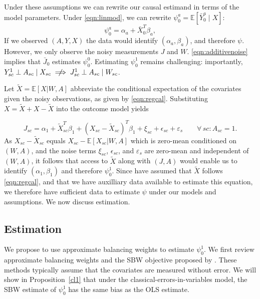 \documentclass[aoas]{imsart}
\theoremstyle{plain}
\theoremstyle{remark}
\begin{document}
Under these assumptions we can rewrite our causal estimand in terms of the model parameters. Under \eqref{eqn:linmod}, we can rewrite $\psi_0^a = \mathbb{E}[\bar{Y}_0^a \mid X]$:
\begin{equation}\label{eqn:outcome}
\psi_0^a = \alpha_a + \bar{X}_0^T\beta_a,   
\end{equation}
If we observed $(A, Y, X)$ the data would identify $(\alpha_a, \beta_a)$, and therefore $\psi$. However, we only observe the noisy measurements $J$ and $W$. \eqref{eqn:additivenoise} implies that $\bar{J}_0$ estimates $\psi_0^0$. Estimating $\psi_0^1$ remains challenging: importantly, $Y_{sc}^1 \perp A_{sc} \mid X_{sc} \centernot\implies J_{sc}^1 \perp A_{sc} \mid W_{sc}$. 

Let $\tilde{X} = \mathbb{E}[X |W, A]$ abbreviate the conditional expectation of the covariates given the noisy observations, as given by \eqref{eqn:regcal}. Substituting $X = \tilde{X} + X - \tilde{X}$ into the outcome model yields

\begin{equation} \label{eqn:JXtilde}
    J_{sc} = \alpha_1 + \tilde{X}_{sc}^T\beta_1 + (X_{sc} - \tilde{X}_{sc})^T\beta_1 + \xi_{sc} + \epsilon_{sc} + \varepsilon_s \qquad\forall\, sc: A_{sc} = 1.
\end{equation}
As $X_{sc} - \tilde{X}_{sc}$ equals $X_{sc} - \mathbb{E}[X_{sc}|W,A]$ which is zero-mean conditioned on $(W,A)$, and the noise terms $\xi_{sc}$, $\epsilon_{sc}$, and $\varepsilon_s$ are zero-mean and independent of $(W, A)$, it follows that access to $\tilde{X}$ along with $(J,A)$  would enable us to identify $(\alpha_1, \beta_1)$ and therefore $\psi_0^1$. Since have assumed that $\tilde{X}$ follows \eqref{eqn:regcal}, and that we have auxilliary data available to estimate this equation, we therefore have sufficient data to estimate $\psi$ under our models and assumptions. We now discuss estimation.

\subsection{Estimation}\label{ssec:estimation}

We propose to use approximate balancing weights to estimate $\psi_0^1$. We first review approximate balancing weights and the SBW objective proposed by \cite{zubizarreta2015stable}. These methods typically assume that the covariates are measured without error. We will show in Proposition~\ref{cl1} that under the classical-errors-in-variables model, the SBW estimate of $\psi_0^1$ has the same bias as the OLS estimate.
\end{document}
